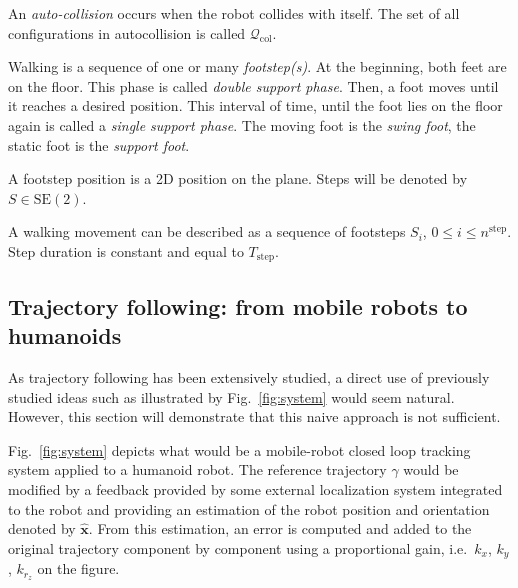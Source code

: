 An \emph{auto-collision} occurs when the robot collides with
itself. The set of all configurations in autocollision is called
\mbox{$\mathcal{Q}_{\text{col}}$}.

Walking is a sequence of one or many \emph{footstep(s)}. At the
beginning, both feet are on the floor. This phase is called
\emph{double support phase}. Then, a foot moves until it reaches a
desired position. This interval of time, until the foot lies on the
floor again is called a \emph{single support phase}. The moving foot
is the \emph{swing foot}, the static foot is the \emph{support foot}.

A footstep position is a 2D position on the plane. Steps will be
denoted by \mbox{$S \in \text{SE}(2)$}.

A walking movement can be described as a sequence of footsteps $S_i$,
\mbox{$0 \leq i \leq n^{\text{step}}$}. Step duration is constant and equal
to $T_{\text{step}}$.


\subsection{Trajectory following: from mobile robots to humanoids}


As trajectory following has been extensively studied, a direct use of
previously studied ideas such as illustrated by Fig.~\ref{fig:system}
would seem natural. However, this section will demonstrate that this
naive approach is not sufficient.


Fig.~\ref{fig:system} depicts what would be a mobile-robot closed loop
tracking system applied to a humanoid robot. The reference trajectory
$\gamma$ would be modified by a feedback provided by some external
localization system integrated to the robot and providing an
estimation of the robot position and orientation denoted by
$\hat{\mathbf{x}}$. From this estimation, an error is computed and
added to the original trajectory component by component using a
proportional gain, i.e.\ $k_x$, $k_y$, $k_{r_z}$ on the figure.


